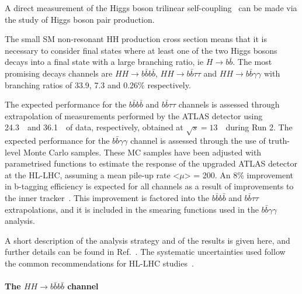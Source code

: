 A direct measurement of the Higgs boson trilinear self-coupling \lHHH\ can be made via the study of Higgs boson pair production. %

The small SM non-resonant HH production cross section means that it is necessary to consider final states where at least one of the two Higgs bosons decays into a final state with a large branching ratio, ie $H \rightarrow b\bar{b}$. The most promising decays channels are $HH \rightarrow b\bar{b}b\bar{b}$, $HH \rightarrow b\bar{b}\tau\tau$ and $HH \rightarrow b\bar{b}\gamma\gamma$ with branching ratios of 33.9, 7.3 and 0.26\% respectively.

The expected performance for the $b\bar{b}b\bar{b}$ and $b\bar{b}\tau\tau$ channels is assessed through extrapolation of measurements performed by the ATLAS detector using 24.3~\fbinv\ and 36.1~\fbinv\ of data, respectively, obtained at $\sqrt{s} = 13$~\TeV\ during Run 2.
The expected performance for the $b\bar{b}\gamma\gamma$ channel is assessed through the use of truth-level Monte Carlo samples. 
These MC samples have been adjusted with parametrised functions to estimate the response of the upgraded ATLAS detector at the HL-LHC, assuming a mean pile-up rate <$\mu$> = 200. 
An 8\% improvement in b-tagging efficiency is expected for all channels as a result of improvements to the inner tracker~\cite{ITKPixelTDR}.
This improvement is factored into the $b\bar{b}b\bar{b}$ and $b\bar{b}\tau\tau$ extrapolations, and it is included in the smearing functions used in the $b\bar{b}\gamma\gamma$ analysis.

A short description of the analysis strategy and of the results is given here, and further details can be found in Ref.~\cite{ATLASHHPUBnote}. The systematic uncertainties used follow the common recommendations for HL-LHC studies~\cite{ATLASperfPUBnote}. 



%
\paragraph{The $HH \rightarrow b\bar{b}b\bar{b}$ channel}

